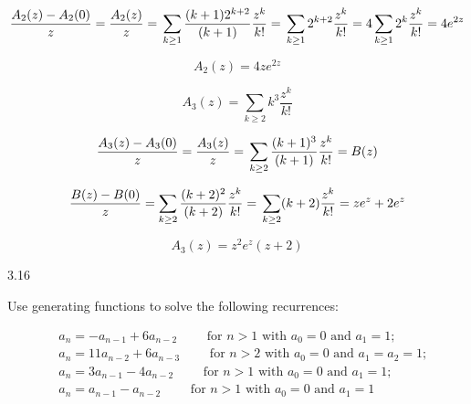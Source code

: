 \documentclass[12pt]{article}
\begin{document}
\begin{equation}
\frac{A_2(z) - A_2(0)}{z} = \frac{A_2(z)}{z} = \\
\sum_{k \geq 1}\frac{(k+1)2^{k+2}}{(k+1)}\frac{z^k}{k!} = \\
\sum_{k \geq 1}2^{k+2}\frac{z^k}{k!} = \\
4\sum_{k \geq 1}2^k\frac{z^k}{k!} = 4e^{2z}\nonumber
\end{equation}

\begin{equation}
A_2(z) = 4ze^{2z} \nonumber
\end{equation}

\begin{equation}
A_3(z) = \sum_{k \geq 2} k^3 \frac{z^k}{k!} \nonumber
\end{equation}

\begin{equation}
\frac{A_3(z) - A_3(0)}{z} = \frac{A_3(z)}{z} = \\
\sum_{k \geq 2} \frac{(k+1)^3}{(k+1)} \frac{z^k}{k!} = B(z) \nonumber
\end{equation}

\begin{equation}
\frac{B(z) - B(0)}{z} = \sum_{k \geq 2}\frac{(k+2)^2}{(k+2)}\frac{z^k}{k!} =\\
\sum_{k \geq 2}(k + 2)\frac{z^k}{k!} = ze^z + 2e^z \nonumber
\end{equation}

\begin{equation}
A_3(z) = z^2e^z(z + 2) \nonumber
\end{equation}

3.16

Use generating functions to solve the following recurrences:

\begin{equation}
\begin{aligned}
& a_n = -a_{n - 1} + 6a_{n - 2} \qquad \text{ for ${n > 1}$ with ${a_0 = 0}$ and ${a_1 = 1}$;} \\
& a_n = 11a_{n - 2} + 6a_{n - 3} \qquad \text{ for ${n > 2}$ with ${a_0 = 0}$ and ${a_1 = a_2 = 1}$;} \\
& a_n = 3a_{n - 1} - 4a_{n - 2} \qquad \text{ for ${n > 1}$ with ${a_0 = 0}$ and ${a_1 = 1}$;} \\
& a_n = a_{n - 1} - a_{n - 2} \qquad \text{ for ${n > 1}$ with ${a_0 = 0}$ and ${a_1 = 1}$} \nonumber
\end{aligned}
\end{equation}
\end{document}
